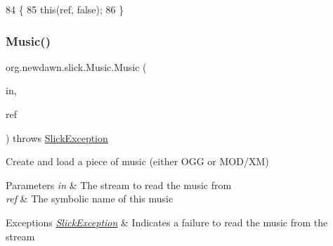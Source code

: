 \begin{DoxyCode}
84                                                 \{
85         \textcolor{keyword}{this}(ref, \textcolor{keyword}{false});
86     \}
\end{DoxyCode}
\mbox{\label{classorg_1_1newdawn_1_1slick_1_1_music_ab50cfd31e4ecf9c4da88bfd1294cfd12}} 
\subsubsection{\texorpdfstring{Music()}{Music()}\hspace{0.1cm}{\footnotesize\ttfamily [3/5]}}
{\footnotesize\ttfamily org.\+newdawn.\+slick.\+Music.\+Music (\begin{DoxyParamCaption}\item[{Input\+Stream}]{in,  }\item[{String}]{ref }\end{DoxyParamCaption}) throws \mbox{\hyperlink{classorg_1_1newdawn_1_1slick_1_1_slick_exception}{Slick\+Exception}}\hspace{0.3cm}{\ttfamily [inline]}}

Create and load a piece of music (either O\+GG or M\+O\+D/\+XM) 
\begin{DoxyParams}{Parameters}
{\em in} & The stream to read the music from \\
\hline
{\em ref} & The symbolic name of this music \\
\hline
\end{DoxyParams}

\begin{DoxyExceptions}{Exceptions}
{\em \mbox{\hyperlink{classorg_1_1newdawn_1_1slick_1_1_slick_exception}{Slick\+Exception}}} & Indicates a failure to read the music from the stream \\
\hline
\end{DoxyExceptions}

